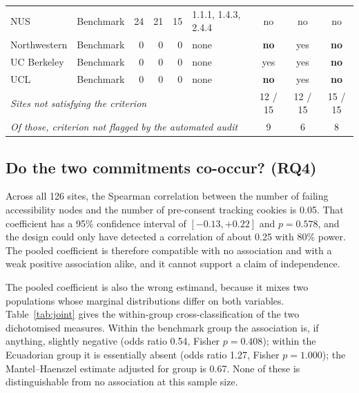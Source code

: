 \documentclass[]{interact}
\begin{document}
\begin{table}[htbp]
\begin{tabular}{llrrrlccc}
		NUS          & Benchmark & 24 & 21 & 15 & 1.1.1, 1.4.3, 2.4.4 & no          & no          & no          \\
		Northwestern & Benchmark &  0 &  0 &  0 & none                & \textbf{no} & yes         & \textbf{no} \\
		UC Berkeley  & Benchmark &  0 &  0 &  0 & none                & yes         & yes         & \textbf{no} \\
		UCL          & Benchmark &  0 &  0 &  0 & none                & \textbf{no} & yes         & \textbf{no} \\
		\midrule
		\multicolumn{6}{l}{\emph{Sites not satisfying the criterion}} & 12 / 15 & 12 / 15 & 15 / 15 \\
		\multicolumn{6}{l}{\emph{Of those, criterion not flagged by the automated audit}} & 9 & 6 & 8 \\
		\bottomrule
	\end{tabular}
\end{table}

\subsection{Do the two commitments co-occur? (RQ4)}\label{sec:results-joint}

Across all 126 sites, the Spearman correlation between the number of failing accessibility nodes and the number of pre-consent tracking cookies is 0.05. That coefficient has a 95\% confidence interval of $[-0.13, +0.22]$ and $p=0.578$, and the design could only have detected a correlation of about 0.25 with 80\% power. The pooled coefficient is therefore compatible with no association and with a weak positive association alike, and it cannot support a claim of independence.

The pooled coefficient is also the wrong estimand, because it mixes two populations whose marginal distributions differ on both variables. Table~\ref{tab:joint} gives the within-group cross-classification of the two dichotomised measures. Within the benchmark group the association is, if anything, slightly negative (odds ratio 0.54, Fisher $p=0.408$); within the Ecuadorian group it is essentially absent (odds ratio 1.27, Fisher $p=1.000$); the Mantel--Haenszel estimate adjusted for group is 0.67. None of these is distinguishable from no association at this sample size.
\end{document}
